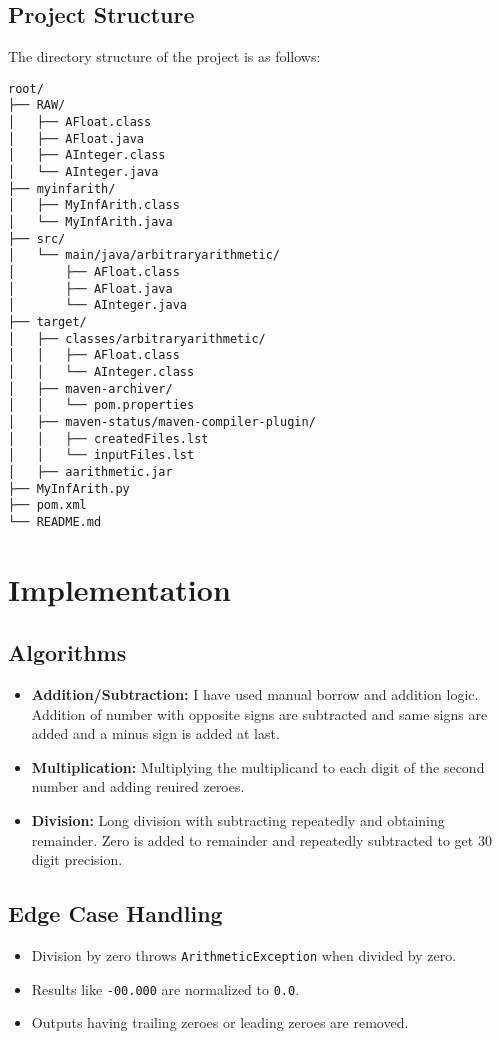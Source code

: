 \documentclass[12pt]{article}
\begin{document}
\subsection{Project Structure}
The directory structure of the project is as follows:
\begin{verbatim}
root/
├── RAW/
│   ├── AFloat.class
│   ├── AFloat.java
│   ├── AInteger.class
│   └── AInteger.java
├── myinfarith/
│   ├── MyInfArith.class
│   └── MyInfArith.java
├── src/
│   └── main/java/arbitraryarithmetic/
│       ├── AFloat.class
│       ├── AFloat.java
│       └── AInteger.java
├── target/
│   ├── classes/arbitraryarithmetic/
│   │   ├── AFloat.class
│   │   └── AInteger.class
│   ├── maven-archiver/
│   │   └── pom.properties
│   ├── maven-status/maven-compiler-plugin/
│   │   ├── createdFiles.lst
│   │   └── inputFiles.lst
│   ├── aarithmetic.jar
├── MyInfArith.py
├── pom.xml
└── README.md
\end{verbatim}
\section{Implementation}
\subsection{Algorithms}
\begin{itemize}[leftmargin=*]
    \item \textbf{Addition/Subtraction:} I have used manual borrow and addition logic.
    Addition of number with opposite signs are subtracted and same signs are added and a minus sign is added at last.
    \item \textbf{Multiplication:} Multiplying the multiplicand to each digit of the second number and adding reuired zeroes.
    \item \textbf{Division:} Long division with  subtracting repeatedly and obtaining remainder. Zero is added to remainder and repeatedly subtracted to get 30 digit precision.
    
\end{itemize}

\subsection{Edge Case Handling}
\begin{itemize}[leftmargin=*]
    \item Division by zero throws \texttt{ArithmeticException} when divided by zero.
    \item Results like \texttt{-00.000} are normalized to \texttt{0.0}.
    \item Outputs having trailing zeroes or leading zeroes are removed.
\end{itemize}
\end{document}
